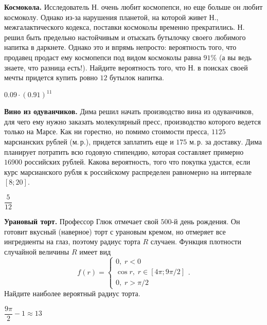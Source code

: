 \documentclass[12pt, addpoints]{exam} %
\begin{document}
\begin{questions}
\question \textbf{Космокола.} Исследователь Н. очень любит космопепси, но еще больше он любит космоколу. Однако из-за нарушения планетой, на которой живет Н., межгалактического кодекса, поставки космоколы временно прекратились. Н. решил быть предельно настойчивым и отыскать бутылочку своего любимого напитка в даркнете. Однако это и впрямь непросто: вероятность того, что продавец продаст ему космопепси под видом космоколы равна $91\%$ (а вы ведь знаете, что разница есть!). Найдите вероятность того, что Н. в поисках своей мечты придется купить ровно $12$ бутылок напитка.

\begin{solution}
 $0.09\cdot(0.91)^{11}$
\end{solution}

\question \textbf{Вино из одуванчиков.} Дима решил начать производство вина из одуванчиков, для чего ему нужно заказать молекулярный пресс, производство которого ведется только на Марсе. Как ни горестно, но помимо стоимости пресса,  $1125$  марсианских рублей (м.\,р.), придется заплатить еще и $175$ м.\,р. за доставку. Дима планирует потратить всю годовую стипендию, которая составляет примерно $16900$ российских рублей. Какова вероятность, того что покупка удастся, если курс марсианского рубля к российскому распределен равномерно на интервале $[8; 20]$.

\begin{solution}
 $\dfrac{5}{12}$
\end{solution}

\question \textbf{Урановый торт.} Профессор Глюк отмечает свой $500$-й день рождения. Он готовит вкусный (наверное) торт с урановым кремом, но отмеряет все ингредиенты на глаз, поэтому радиус торта $R$ случаен. Функция плотности случайной величины $R$ имеет вид
\[
f(r)=\begin{cases}
0, \; r < 0 \\
\cos r, \; r \in [4\pi;9\pi/2] \\
0, \; r > \pi/2
\end{cases}.
\]
Найдите наиболее вероятный радиус торта.

\begin{solution}
$ \dfrac{9 \pi}{2} - 1 \approx 13 $
\end{solution}

\end{questions}


\newpage
\end{document}
